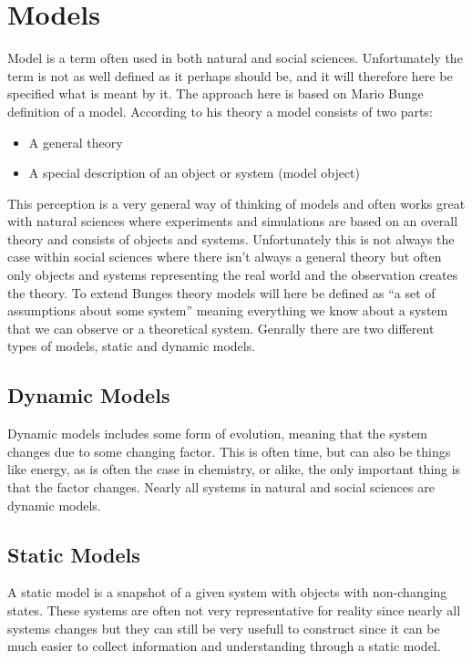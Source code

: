 \chapter{Models}
Model is a term often used in both natural and social sciences. Unfortunately the term is not as well defined as it perhaps should be, and it will therefore here be specified what is meant by it. The approach here is based on Mario Bunge definition of a model. According to his theory a model consists of two parts:
\begin{itemize}
\item A general theory
\item A special description of an object or system (model object)
\end{itemize}
This perception is a very general way of thinking of models and often works great with natural sciences where experiments and simulations are based on an overall theory and consists of objects and systems. Unfortunately this is not always the case within social sciences where there isn't always a general theory but often only objects and systems representing the real world and the observation creates the theory.
To extend Bunges theory models will here be defined as \enquote{a set of assumptions about some system} meaning everything we know about a system that we can observe or a theoretical system.
Genrally there are two different types of models, static and dynamic models.

\section{Dynamic Models}
Dynamic models includes some form of evolution, meaning that the system changes due to some changing factor. This is often time, but can also be things like energy, as is often the case in chemistry, or alike, the only important thing is that the factor changes. Nearly all systems in natural and social sciences are dynamic models.

\section{Static Models}
A static model is a snapshot of a given system with objects with non-changing states. These systems are often not very representative for reality since nearly all systems changes but they can still be very usefull to construct since it can be much easier to collect information and understanding through a static model. 


